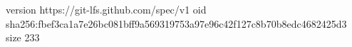 version https://git-lfs.github.com/spec/v1
oid sha256:fbef3ca1a7e26bc081bff9a569319753a97e96c42f127c8b70b8edc4682425d3
size 233
